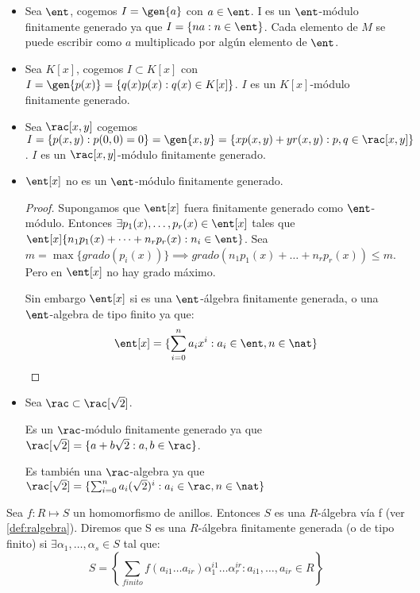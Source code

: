 \begin{example}
	\begin{itemize}
	\item Sea $\ent$, cogemos $I=\gen{a}$ con $a\in \ent$. I es un $\ent$-módulo finitamente generado ya que $I=\{na:n \in \ent \}$. Cada elemento de $M$ se puede escribir como $a$ multiplicado por algún elemento de $\ent$.
	\item Sea $K[x]$, cogemos $I \subset K[x]$ con $I=\gen{p(x)}=\{ q(x)p(x): q(x) \in K[x] \}$. $I$ es un $K[x]$-módulo finitamente generado.
	\item Sea $\rac[x,y]$ cogemos $I=\{ p(x,y):p(0,0)=0 \}=\gen{x,y}=\{ xp(x,y)+yr(x,y): p,q \in \rac[x,y] \}$. $I$ es un $\rac[x,y]$-módulo finitamente generado.
	\item $\ent[x]$ no es un $\ent$-módulo finitamente generado.

	\begin{proof}
		Supongamos que $\ent[x]$ fuera finitamente generado como $\ent$-módulo. Entonces $\exists p_1(x),\dots,p_r(x) \in \ent[x]$ tales que $\ent[x]\{ n_1p_1(x)+\dots+n_rp_r(x): n_i \in \ent \}$. Sea $m=\max\{grado(p_i(x)) \} \implies grado(n_1p_1(x)+\dots+n_rp_r(x)) \leq m$. Pero en $\ent[x]$ no hay grado máximo.

		Sin embargo $\ent[x]$ si es una $\ent$-álgebra finitamente generada, o una $\ent$-algebra de tipo finito ya que:
		$$ \ent[x]=\{ \sum_{i=0}^n a_i x^i: a_i \in \ent, n \in \nat \}$$
	\end{proof}
	\item Sea $\rac \subset \rac[\sqrt{2}]$.

	Es un $\rac$-módulo finitamente generado ya que $\rac[\sqrt{2}]=\{ a+b\sqrt{2}:a,b \in \rac \}$.

	Es también una $\rac$-algebra ya que $\rac[\sqrt{2}]=\{ \sum_{i=0}^n a_i(\sqrt{2})^i :a_i \in \rac, n \in \nat \}$
\end{itemize}
\end{example}

\begin{defn}\label{def:ralgebra_fg}
	Sea $f: R \longmapsto S$ un homomorfismo de anillos. Entonces $S$ es una $R$-álgebra vía f (ver \ref{def:ralgebra}). Diremos que S es una $R$-álgebra finitamente generada (o de tipo finito) si $\exists \alpha_1,\dots, \alpha_s \in S$ tal que:
	$$ S=\left\{ \sum_{finito} f(a_{i1}\dots a_{ir})\alpha_1^{i1}\dots\alpha_r^{ir}: a_{i1},\dots, a_{ir} \in R \right\} $$
\end{defn}

